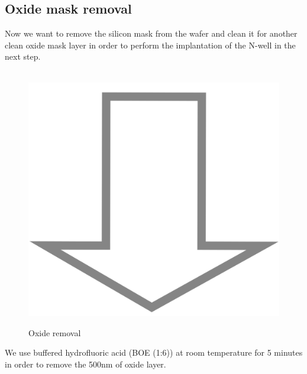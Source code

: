 \subsection{Oxide mask removal}
Now we want to remove the silicon mask from the wafer and clean it for another clean oxide mask layer in order to perform the implantation of the N-well in the next step.

\begin{figure}[H]
	\centering
	\begin{tikzpicture}[node distance = 3cm, auto, thick,scale=\CrossSectionOnly, every node/.style={transform shape}]
		
	\end{tikzpicture} \\
	\includegraphics[scale=0.01]{down_arrow.png} \\
	\begin{tikzpicture}[node distance = 3cm, auto, thick,scale=\CrossSectionOnly, every node/.style={transform shape}]
		
	\end{tikzpicture}
	\caption{Oxide removal}
\end{figure}

We use buffered hydrofluoric acid (BOE (1:6)) at room temperature for 5 minutes in order to remove the 500nm of oxide layer.